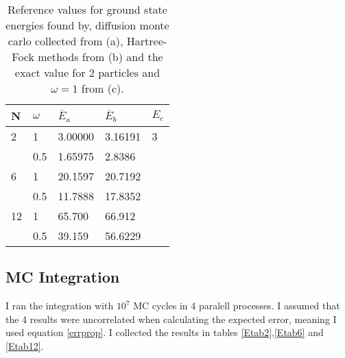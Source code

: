 \documentclass[a4paper,English,10pt]{article}
\renewcommand{\bar}{\overline}
\begin{document}
\begin{table}
  \centering
  \caption[Reference energies]{Reference values for ground state energies found by, diffusion monte carlo  collected from \cite{mortenref} (a), Hartree-Fock
    methods from \cite{proj1} (b) and the exact value for 2 particles and $\omega = 1$ from \cite{taut} (c).}
  \label{tabMref}
  \begin{tabular}{lllll}
    \toprule
    N&$\omega$&$\bar{E}_{a}$&$\bar{E}_b$&$E_c$\\
    \midrule
    2&1&3.00000 &3.16191 & 3\\
    &0.5&1.65975& 2.8386&\\
    6&1&20.1597&20.7192&\\
    &0.5&11.7888&17.8352&\\
    12&1&65.700&66.912&\\
    &0.5&39.159&56.6229&\\
    \bottomrule
  \end{tabular}
\end{table}

\subsection{MC Integration}
I ran the integration with $10^7$ MC cycles in 4 paralell processes. I assumed that the 4 results were uncorrelated when calculating the expected error, meaning I used equation
\ref{errprop}. I collected the results in tables \ref{Etab2},\ref{Etab6} and \ref{Etab12}.
\end{document}
